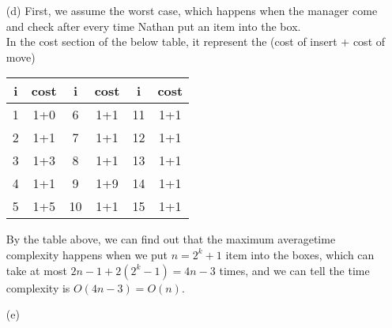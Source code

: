 \documentclass{homework}
\begin{document}
\begin{itemize}
    \item[(d)]
    First, we assume the worst case, which happens when the manager come and check after every time Nathan put an item into the box.\\
    In the cost section of the below table, it represent the (cost of insert + cost of move)\\
    \begin{table}[H]
        \centering
        \begin{tabular}{|c|c|c|c|c|c|}
            \hline
            i  & cost & i  & cost & i  & cost \\\hline
            1  & 1+0  & 6  & 1+1  & 11 & 1+1  \\\hline
            2  & 1+1  & 7  & 1+1  & 12 & 1+1  \\\hline
            3  & 1+3  & 8  & 1+1  & 13 & 1+1  \\\hline
            4  & 1+1  & 9  & 1+9  & 14 & 1+1  \\\hline
            5  & 1+5  & 10 & 1+1  & 15 & 1+1  \\\hline
        \end{tabular}
    \end{table}
    By the table above, we can find out that the maximum averagetime complexity happens when we put $n=2^k+1$ item into the boxes, which can take at most $2n-1+2(2^k-1)=4n-3$ times, and we can tell the time complexity is $O(4n-3)=O(n)$.

    \item[(e)] %
    

\end{itemize}
\clearpage
\end{document}
